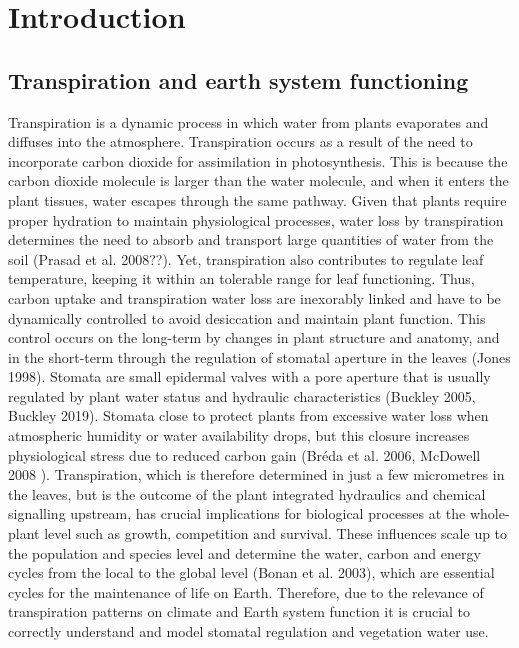 \documentclass[11pt,twoside]{reedthesis}
\begin{document}
\captionsetup[figure]{font=small} \setlength{\parindent}{30pt}
\setlength{\parskip}{0.2cm plus4mm minus3mm}

\chapter{Introduction}\label{introduction}

\newpage

\section{Transpiration and earth system
functioning}\label{transpiration-and-earth-system-functioning}

Transpiration is a dynamic process in which water from plants evaporates
and diffuses into the atmosphere. Transpiration occurs as a result of
the need to incorporate carbon dioxide for assimilation in
photosynthesis. This is because the carbon dioxide molecule is larger
than the water molecule, and when it enters the plant tissues, water
escapes through the same pathway. Given that plants require proper
hydration to maintain physiological processes, water loss by
transpiration determines the need to absorb and transport large
quantities of water from the soil (Prasad et al. 2008??). Yet,
transpiration also contributes to regulate leaf temperature, keeping it
within an tolerable range for leaf functioning. Thus, carbon uptake and
transpiration water loss are inexorably linked and have to be
dynamically controlled to avoid desiccation and maintain plant function.
This control occurs on the long-term by changes in plant structure and
anatomy, and in the short-term through the regulation of stomatal
aperture in the leaves (Jones 1998). Stomata are small epidermal valves
with a pore aperture that is usually regulated by plant water status and
hydraulic characteristics (Buckley 2005, Buckley 2019). Stomata close to
protect plants from excessive water loss when atmospheric humidity or
water availability drops, but this closure increases physiological
stress due to reduced carbon gain (Bréda et al. 2006, McDowell 2008 ).
Transpiration, which is therefore determined in just a few micrometres
in the leaves, but is the outcome of the plant integrated hydraulics and
chemical signalling upstream, has crucial implications for biological
processes at the whole-plant level such as growth, competition and
survival. These influences scale up to the population and species level
and determine the water, carbon and energy cycles from the local to the
global level (Bonan et al. 2003), which are essential cycles for the
maintenance of life on Earth. Therefore, due to the relevance of
transpiration patterns on climate and Earth system function it is
crucial to correctly understand and model stomatal regulation and
vegetation water use.\par
\end{document}
